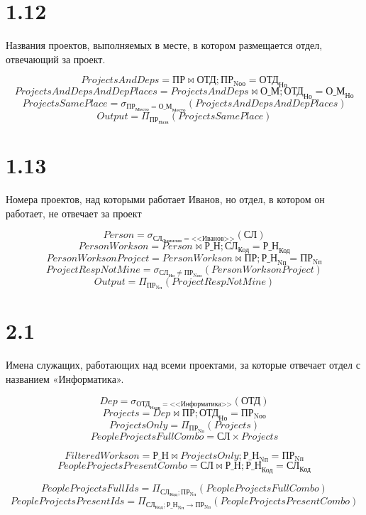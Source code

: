 \documentclass{article}
\newcommand{\employee}{\textbf{СЛ}}
\newcommand{\department}{\textbf{ОТД}}
\newcommand{\depplace}{\textbf{О\_М}}
\newcommand{\project}{\textbf{ПР}}
\newcommand{\workson}{\textbf{Р\_Н}}
\newcommand{\employeeLastname}{\textbf{СЛ}_\text{Фамилия}}
\newcommand{\employeeId}{\textbf{СЛ}_\text{Код}}
\newcommand{\employeeDepId}{\textbf{СЛ}_\text{Но}}
\newcommand{\departmentName}{\textbf{ОТД}_\text{Назв}}
\newcommand{\departmentId}{\textbf{ОТД}_\text{Но}}
\newcommand{\depplaceDep}{\textbf{О\_М}_\text{Но}}
\newcommand{\depplacePlace}{\textbf{О\_М}_\text{Место}}
\newcommand{\projectName}{\textbf{ПР}_\text{Назв}}
\newcommand{\projectId}{\textbf{ПР}_\text{Nп}}
\newcommand{\projectPlace}{\textbf{ПР}_\text{Место}}
\newcommand{\projectResponsibleDepId}{\textbf{ПР}_\text{Nоо}}
\newcommand{\worksonEmpId}{\textbf{Р\_Н}_\text{Код}}
\newcommand{\worksonProjId}{\textbf{Р\_Н}_\text{Nп}}
\newcommand{\filter}[2]{\sigma{}_{#1} \left( #2 \right)}
\newcommand{\join}[3]{ #1 \bowtie #2; #3 }
\newcommand{\select}[2]{\Pi_{#1}\left( #2 \right)}
\begin{document}
\section{1.12}

Названия проектов, выполняемых в месте, в котором размещается отдел, отвечающий за проект.

$$ ProjectsAndDeps = \join{\project}{\department}{\projectResponsibleDepId = \departmentId}$$
$$ ProjectsAndDepsAndDepPlaces = \join{ProjectsAndDeps}{\depplace}{\departmentId = \depplaceDep}$$
$$ ProjectsSamePlace = \filter{\projectPlace = \depplacePlace}{ProjectsAndDepsAndDepPlaces}$$
$$ Output = \select{\projectName}{ProjectsSamePlace}$$

\section{1.13}

Номера проектов, над которыми работает Иванов, но отдел, в котором он работает, не отвечает за проект

$$ Person = \filter{\employeeLastname = \text{<<Иванов>>}}{\employee} $$
$$ PersonWorkson = \join{Person}{\workson}{\employeeId = \worksonEmpId}$$
$$ PersonWorksonProject = \join{PersonWorkson}{\project}{\worksonProjId = \projectId}$$
$$ ProjectRespNotMine = \filter{\employeeDepId \neq \projectResponsibleDepId}{PersonWorksonProject}$$
$$ Output = \select{\projectId}{ProjectRespNotMine}$$


\section{2.1}
Имена служащих, работающих над всеми проектами, за которые отвечает отдел с названием «Информатика».

$$ Dep = \filter{\departmentName = \text{<<Информатика>>}}{\department}$$
$$ Projects = \join{Dep}{\project}{\departmentId = \projectResponsibleDepId}$$
$$ ProjectsOnly = \select{\projectId}{Projects}$$
$$ PeopleProjectsFullCombo = \employee \times Projects$$

$$ FilteredWorkson = \join{\workson}{ProjectsOnly}{\worksonProjId = \projectId}$$
$$ PeopleProjectsPresentCombo = \join{\employee}{\workson}{ \worksonEmpId = \employeeId }$$

$$ PeopleProjectsFullIds = \select{\employeeId; \projectId}{PeopleProjectsFullCombo}$$
$$ PeopleProjectsPresentIds = \select{\employeeId; \worksonProjId \rightarrow \projectId}{PeopleProjectsPresentCombo}$$
\end{document}

